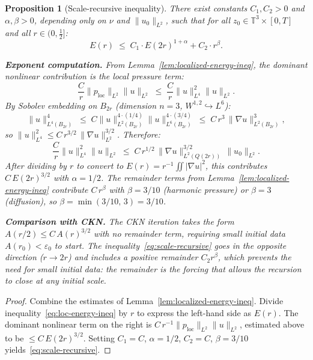 \documentclass[11pt]{article}
\newtheorem{proposition}[theorem]{Proposition}
\theoremstyle{definition}
\theoremstyle{remark}
\newcommand{\T}{\mathbb{T}}
\begin{document}
\begin{proposition}[Scale-recursive inequality]\label{prop:scale-recursive}
  There exist constants $C_1, C_2 > 0$ and $\alpha, \beta > 0$, depending only
  on $\nu$ and $\|u_0\|_{L^2}$, such that for all $z_0\in\T^3\times[0,T]$
  and all $r\in(0,\tfrac{1}{2}]$:
  \begin{equation}\label{eq:scale-recursive}
    E(r) \;\leq\; C_1\cdot E(2r)^{1+\alpha} + C_2\cdot r^\beta.
  \end{equation}

  \textbf{Exponent computation.}  From Lemma~\ref{lem:localized-energy-ineq},
  the dominant nonlinear contribution is the local pressure term:
  \[
    \frac{C}{r}\|p_{\mathrm{loc}}\|_{L^2}\|u\|_{L^2}
    \;\leq\; \frac{C}{r}\|u\|_{L^4}^2\|u\|_{L^2}.
  \]
  By Sobolev embedding on $B_{2r}$ (dimension $n=3$, $W^{1,2}\hookrightarrow L^6$):
  \[
    \|u\|_{L^4(B_{2r})}^4
    \;\leq\; C\|u\|_{L^2(B_{2r})}^{4\cdot(1/4)}\|u\|_{L^6(B_{2r})}^{4\cdot(3/4)}
    \;\leq\; C\,r^3\,\|\nabla u\|_{L^2(B_{2r})}^3,
  \]
  so $\|u\|_{L^4}^2\leq C\,r^{3/2}\,\|\nabla u\|_{L^2}^{3/2}$.  Therefore:
  \[
    \frac{C}{r}\|u\|_{L^4}^2\|u\|_{L^2}
    \;\leq\; C\,r^{1/2}\,\|\nabla u\|_{L^2(Q(2r))}^{3/2}\,\|u_0\|_{L^2}.
  \]
  After dividing by $r$ to convert to $E(r) = r^{-1}\iint|\nabla u|^2$, this
  contributes $C\,E(2r)^{3/2}$ with $\alpha = 1/2$.  The remainder terms from
  Lemma~\ref{lem:localized-energy-ineq} contribute $C\,r^\beta$ with $\beta=3/10$
  (harmonic pressure) or $\beta=3$ (diffusion), so $\beta=\min(3/10,\,3)=3/10$.

  \medskip
  \noindent\textbf{Comparison with CKN.}  The CKN iteration takes the form
  $A(r/2)\leq C\,A(r)^{3/2}$ with no remainder term, requiring small initial
  data $A(r_0)<\varepsilon_0$ to start.  The inequality~\eqref{eq:scale-recursive}
  goes in the opposite direction ($r\to 2r$) and includes a positive remainder
  $C_2 r^\beta$, which prevents the need for small initial data: the remainder
  is the \emph{forcing} that allows the recursion to close at any initial scale.
\end{proposition}

\begin{proof}
  Combine the estimates of Lemma~\ref{lem:localized-energy-ineq}.  Divide
  inequality~\eqref{eq:loc-energy-ineq} by $r$ to express the left-hand side
  as $E(r)$.  The dominant nonlinear term on the right is
  $C\,r^{-1}\|p_{\mathrm{loc}}\|_{L^2}\|u\|_{L^2}$, estimated above to be
  $\leq C\,E(2r)^{3/2}$.  Setting $C_1=C$, $\alpha=1/2$, $C_2=C$, $\beta=3/10$
  yields~\eqref{eq:scale-recursive}.
\end{proof}
\end{document}
